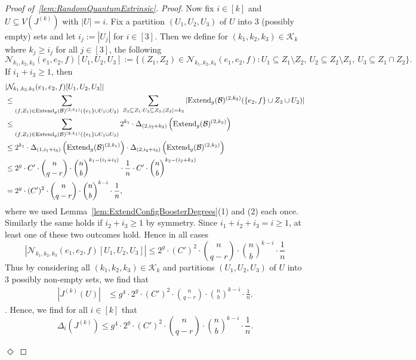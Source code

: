 \documentclass[11pt]{article}
\newcommand{\mc}[1]{\mathcal{#1}}
\newcounter{i}
\theoremstyle{plain}
\newenvironment{proofclaim}[1][]%
{\noindent \emph{Proof.} {}{#1}{}}{\hfill
	$\Diamond$\vspace{1em}}
\renewcommand{\theclaim}{\thetheorem.\arabic{claim}}
\newenvironment{lateproof}[1]
 {%
  \renewcommand{\theclaim}{\ref{#1}.\arabic{claim}}%
  \begin{proof}[Proof of~\cref{#1}]%
 }
 {\end{proof}}
\theoremstyle{plain} %
\theoremstyle{definition}
\begin{document}
\begin{lateproof}{lem:RandomQuantumExtrinsic}
\begin{proofclaim}
Now fix $i\in [k]$ and $U\subseteq V(J^{(k)})$ with $|U|=i$. Fix a partition $(U_1,U_2,U_3)$ of $U$ into 3 (possibly empty) sets and let $i_j:= |U_j|$ for $i\in [3]$. Then we define for $(k_1,k_2,k_3)\in \mc{K}_k$ where $k_j \ge i_j$ for all $j\in [3]$, the following
$$\mc{N}_{k_1,k_2,k_3}(e_1,e_2,f)[U_1,U_2,U_3] := \{(Z_1,Z_2)\in \mc{N}_{k_1,k_2,k_3}(e_1,e_2,f): U_1\subseteq Z_1\setminus Z_2,~U_2\subseteq Z_2\setminus Z_1,~U_3\subseteq Z_1\cap Z_2\}.$$
If $i_1+i_3\ge 1$, then
\begin{align*}
&|\mc{N}_{k_1,k_2,k_3}(e_1,e_2,f)[U_1,U_2,U_3]| \\
&\le \sum_{(f,Z_1)\in {\rm Extend}_g(\mc{B})^{(2,k_1)}(\{e_1\}\cup U_1\cup U_3)}~\sum_{Z_3\subseteq Z_1: U_3\subseteq Z_3, |Z_3|=k_3} |{\rm Extend}_g(\mc{B})^{(2,k_2)}(\{e_2,f\}\cup Z_3\cup U_2)| \\
&\le \sum_{(f,Z_1)\in {\rm Extend}_g(\mc{B})^{(2,k_1)}(\{e_1\}\cup U_1\cup U_3)} 2^{k_1} \cdot \Delta_{(2,i_2+k_3)}\left({\rm Extend}_g(\mc{B})^{(2,k_2)}\right)\\
&\le 2^{k_1}\cdot \Delta_{(1,i_1+i_3)}\left({\rm Extend}_g(\mc{B})^{(2,k_1)}\right)\cdot \Delta_{(2,i_2+i_3)}\left({\rm Extend}_g(\mc{B})^{(2,k_2)}\right)\\
&\le 2^{g}\cdot C'\cdot \binom{n}{q-r}\cdot \binom{n}{b}^{k_1-(i_1+i_3)}\cdot \frac{1}{n} \cdot C'\cdot \binom{n}{b}^{k_2-(i_2+k_3)}\\
&= 2^{g}\cdot (C')^2 \cdot \binom{n}{q-r}\cdot \binom{n}{b}^{k-i}\cdot \frac{1}{n},
\end{align*}
where we used Lemma~\ref{lem:ExtendConfigBoosterDegrees}(1) and (2) each once. Similarly the same holds if $i_2+i_3\ge 1$ by symmetry. Since $i_1+i_2+i_3=i\ge 1$, at least one of these two outcomes hold. Hence in all cases
$$|\mc{N}_{k_1,k_2,k_3}(e_1,e_2,f)[U_1,U_2,U_3]|\le 2^{g}\cdot (C')^2 \cdot \binom{n}{q-r}\cdot \binom{n}{b}^{k-i}\cdot \frac{1}{n}$$
Thus by considering all $(k_1,k_2,k_3)\in \mc{K}_k$ and partitions $(U_1,U_2,U_3)$ of $U$ into $3$ possibly non-empty sets, we find that
\begin{align*}
|J^{(k)}(U)| &\le g^4\cdot 2^{g}\cdot (C')^2 \cdot \binom{n}{q-r}\cdot \binom{n}{b}^{k-i}\cdot \frac{1}{n}.
\end{align*}.
Hence, we find for all $i\in [k]$ that
$$\Delta_i\left(J^{(k)}\right) \le g^4\cdot 2^{g}\cdot (C')^2 \cdot \binom{n}{q-r}\cdot \binom{n}{b}^{k-i}\cdot \frac{1}{n}.$$


\end{proofclaim}
\end{lateproof}
\end{document}

